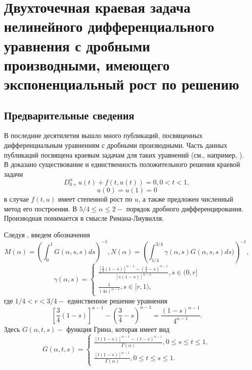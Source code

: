 \chapter{Двухточечная краевая задача нелинейного дифференциального уравнения  с дробными производными, имеющего экспоненциальный рост по решению}

\section{Предварительные сведения}
В последние десятилетия вышло много публикаций, посвященных
дифференциальным уравнениям с дробными производными. Часть данных
публикаций посвящена краевым задачам для таких уравнений (см.,
например, \cite{LitEI10, LitEI11, LitEI12, LitEI13, LitEI14, LitEI15, LitEI16, LitEI17, LitEI18, LitEI19}). В \cite{LitEI15} доказано существование и
единственность положительного решения краевой задачи
\begin{equation}\label{EI9}
D_{0+}^{\alpha} u(t)+f(t,u(t) )=0,0<t<1,
\end{equation}
\begin{equation}\label{EI10}
 u(0)=u(1)=0
\end{equation}
в случае $f(t,u)$ имеет степенной рост по $u$, а также предложен
численный метод его построения. В \cite{LitEI9} $5/4 \leq \alpha \leq 2-$
порядок дробного дифференцирования. Производная понимается в смысле
Римана-Лиувилля.

Следуя \cite{LitEI10}, введем обозначения
$$
M(\alpha)=\left ( \int_0^1 G(\alpha,s,s)ds \right )^{-1},
N(\alpha)=\left
(\int_{1/4}^{3/4}\gamma(\alpha,s)G(\alpha,s,s)ds)\right )^{-1},
$$
$$
\gamma(\alpha,s)=\begin{cases} \frac{\left [\frac{3}{4}(1-s)\right
]^{\alpha-1}-\left (\frac{3}{4}-s \right )^{\alpha-1}}
{[s(1-s)]^{\alpha-1}}, s \in (0,r]  \\
\frac{1}{(4s)^{\alpha-1}},s \in [r,1),
\end{cases}
$$
где $1/4<r<3/4 - $ единственное решение уравнения
$$
\left [\frac{3}{4}(1-s)\right ]^{\alpha-1}-\left (\frac{3}{4}-s
\right )^{\alpha-1}=\frac{(1-s)^{\alpha-1}}{4^{\alpha-1}}.
$$
Здесь $G(\alpha,t,s)-$ функция Грина, которая имеет вид \cite{LitEI10}
$$
G(\alpha,t,s)=\begin{cases}
\frac{[t(1-s)]^{\alpha-1}-(t-s)^{\alpha-1}}{\Gamma(\alpha)}, 0\leq s
\leq t \leq 1, \\
\frac{[t(1-s)]^{\alpha-1}} {\Gamma(\alpha)}, 0\leq t \leq s \leq 1.
\end{cases}
$$

